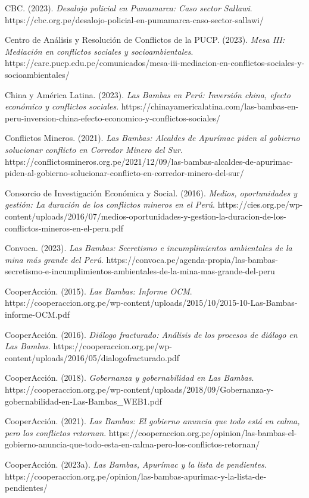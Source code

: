 \documentclass[
  stu,
  floatsintext,
  longtable,
  a4paper,
  nolmodern,
  notxfonts,
  notimes,
  colorlinks=true,linkcolor=blue,citecolor=blue,urlcolor=blue]{apa7}
\begin{document}
CBC. (2023). \emph{Desalojo policial en Pumamarca: Caso sector Sallawi}.
https://cbc.org.pe/desalojo-policial-en-pumamarca-caso-sector-sallawi/

Centro de Análisis y Resolución de Conflictos de la PUCP. (2023).
\emph{Mesa III: Mediación en conflictos sociales y socioambientales}.
https://carc.pucp.edu.pe/comunicados/mesa-iii-mediacion-en-conflictos-sociales-y-socioambientales/

China y América Latina. (2023). \emph{Las Bambas en Perú: Inversión
china, efecto económico y conflictos sociales}.
https://chinayamericalatina.com/las-bambas-en-peru-inversion-china-efecto-economico-y-conflictos-sociales/

Conflictos Mineros. (2021). \emph{Las Bambas: Alcaldes de Apurímac piden
al gobierno solucionar conflicto en Corredor Minero del Sur}.
https://conflictosmineros.org.pe/2021/12/09/las-bambas-alcaldes-de-apurimac-piden-al-gobierno-solucionar-conflicto-en-corredor-minero-del-sur/

Consorcio de Investigación Económica y Social. (2016). \emph{Medios,
oportunidades y gestión: La duración de los conflictos mineros en el
Perú}.
https://cies.org.pe/wp-content/uploads/2016/07/medios-oportunidades-y-gestion-la-duracion-de-los-conflictos-mineros-en-el-peru.pdf

Convoca. (2023). \emph{Las Bambas: Secretismo e incumplimientos
ambientales de la mina más grande del Perú}.
https://convoca.pe/agenda-propia/las-bambas-secretismo-e-incumplimientos-ambientales-de-la-mina-mas-grande-del-peru

CooperAcción. (2015). \emph{Las Bambas: Informe OCM}.
https://cooperaccion.org.pe/wp-content/uploads/2015/10/2015-10-Las-Bambas-informe-OCM.pdf

CooperAcción. (2016). \emph{Diálogo fracturado: Análisis de los procesos
de diálogo en Las Bambas}.
https://cooperaccion.org.pe/wp-content/uploads/2016/05/dialogofracturado.pdf

CooperAcción. (2018). \emph{Gobernanza y gobernabilidad en Las Bambas}.
https://cooperaccion.org.pe/wp-content/uploads/2018/09/Gobernanza-y-gobernabilidad-en-Las-Bambas\_WEB1.pdf

CooperAcción. (2021). \emph{Las Bambas: El gobierno anuncia que todo
está en calma, pero los conflictos retornan}.
https://cooperaccion.org.pe/opinion/las-bambas-el-gobierno-anuncia-que-todo-esta-en-calma-pero-los-conflictos-retornan/

CooperAcción. (2023a). \emph{Las Bambas, Apurímac y la lista de
pendientes}.
https://cooperaccion.org.pe/opinion/las-bambas-apurimac-y-la-lista-de-pendientes/
\end{document}
